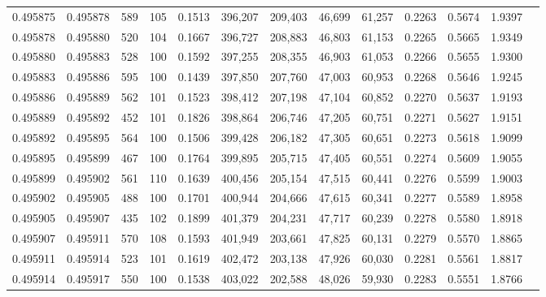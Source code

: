 \begin{tabular}{rrrrrrrrrrrrr}
0.495875 & 0.495878 &   589 & 105 &                                     0.1513 & 396,207 & 209,403 &  46,699 &  61,257 & 0.2263 & 0.5674 & 1.9397 \\
0.495878 & 0.495880 &   520 & 104 &                                     0.1667 & 396,727 & 208,883 &  46,803 &  61,153 & 0.2265 & 0.5665 & 1.9349 \\
0.495880 & 0.495883 &   528 & 100 &                                     0.1592 & 397,255 & 208,355 &  46,903 &  61,053 & 0.2266 & 0.5655 & 1.9300 \\
0.495883 & 0.495886 &   595 & 100 &                                     0.1439 & 397,850 & 207,760 &  47,003 &  60,953 & 0.2268 & 0.5646 & 1.9245 \\
0.495886 & 0.495889 &   562 & 101 &                                     0.1523 & 398,412 & 207,198 &  47,104 &  60,852 & 0.2270 & 0.5637 & 1.9193 \\
0.495889 & 0.495892 &   452 & 101 &                                     0.1826 & 398,864 & 206,746 &  47,205 &  60,751 & 0.2271 & 0.5627 & 1.9151 \\
0.495892 & 0.495895 &   564 & 100 &                                     0.1506 & 399,428 & 206,182 &  47,305 &  60,651 & 0.2273 & 0.5618 & 1.9099 \\
0.495895 & 0.495899 &   467 & 100 &                                     0.1764 & 399,895 & 205,715 &  47,405 &  60,551 & 0.2274 & 0.5609 & 1.9055 \\
0.495899 & 0.495902 &   561 & 110 &                                     0.1639 & 400,456 & 205,154 &  47,515 &  60,441 & 0.2276 & 0.5599 & 1.9003 \\
0.495902 & 0.495905 &   488 & 100 &                                     0.1701 & 400,944 & 204,666 &  47,615 &  60,341 & 0.2277 & 0.5589 & 1.8958 \\
0.495905 & 0.495907 &   435 & 102 &                                     0.1899 & 401,379 & 204,231 &  47,717 &  60,239 & 0.2278 & 0.5580 & 1.8918 \\
0.495907 & 0.495911 &   570 & 108 &                                     0.1593 & 401,949 & 203,661 &  47,825 &  60,131 & 0.2279 & 0.5570 & 1.8865 \\
0.495911 & 0.495914 &   523 & 101 &                                     0.1619 & 402,472 & 203,138 &  47,926 &  60,030 & 0.2281 & 0.5561 & 1.8817 \\
0.495914 & 0.495917 &   550 & 100 &                                     0.1538 & 403,022 & 202,588 &  48,026 &  59,930 & 0.2283 & 0.5551 & 1.8766 \\

\end{tabular}
